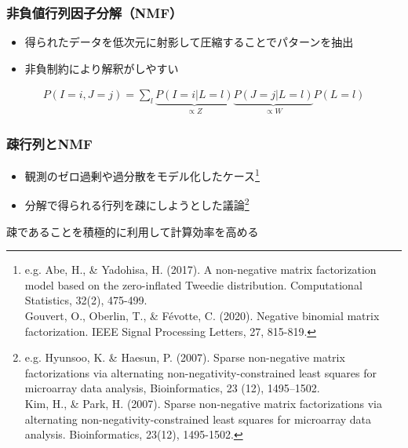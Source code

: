 \documentclass[dvipdfmx, dvipsnames]{beamer}
\begin{document}
\begin{frame}
\frametitle{非負値行列因子分解（NMF）}
\begin{itemize}
\item 得られたデータを低次元に射影して圧縮することでパターンを抽出
\item 非負制約により解釈がしやすい 
\end{itemize}

\begin{figure}

\end{figure}

\begin{align*}
P(I=i , J=j) = \sum_l  \underbrace{P(I=i |L= l)}_{ \propto Z}  \underbrace{P(J=j |L= l)}_{ \propto W} P(L=l)
\end{align*}

\end{frame}

\begin{frame}
\frametitle{疎行列とNMF}
\begin{itemize}
\item 観測のゼロ過剰や過分散をモデル化したケース\footnote{e.g. Abe, H., \& Yadohisa, H. (2017). A non-negative matrix factorization model based on the zero-inflated Tweedie distribution. Computational Statistics, 32(2), 475-499. \\ Gouvert, O., Oberlin, T., \& F\'evotte, C. (2020). Negative binomial matrix factorization. IEEE Signal Processing Letters, 27, 815-819.}
\item 分解で得られる行列を疎にしようとした議論\footnote{e.g.  Hyunsoo, K. \&  Haesun, P. (2007). Sparse non-negative matrix factorizations via alternating non-negativity-constrained least squares for microarray data analysis, Bioinformatics,  23 (12), 1495--1502. \\ Kim, H., \& Park, H. (2007). Sparse non-negative matrix factorizations via alternating non-negativity-constrained least squares for microarray data analysis. Bioinformatics, 23(12), 1495-1502.}
 \end{itemize}

\vfill

 疎であることを積極的に利用して計算効率を高める
\end{frame}
 
\end{document}
